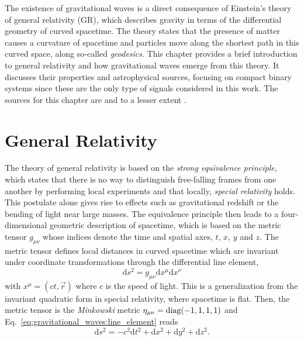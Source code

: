 The existence of gravitational waves is a direct consequence of Einstein's theory of general relativity (GR), which describes gravity in terms of the differential geometry of curved spacetime. The theory states that the presence of matter causes a curvature of spacetime and particles move along the shortest path in this curved space, along so-called \emph{geodesics}.
This chapter provides a brief introduction to general relativity and how gravitational waves emerge from this theory. It discusses their properties and astrophysical sources, focusing on compact binary systems since these are the only type of signals considered in this work. The sources for this chapter are \cite{10.1093/acprof:oso/9780198570745.001.0001} and to a lesser extent \cite{Carroll_2004}. 

\section{General Relativity}


The theory of general relativity is based on the \emph{strong equivalence principle}, which states that there is no way to distinguish free-falling frames from one another by performing local experiments and that locally, \emph{special relativity} holds. This postulate alone gives rise to effects such as gravitational redshift or the bending of light near large masses. The equivalence principle then leads to a four-dimensional geometric description of spacetime, which is based on the metric tensor $g_{\mu\nu}$ whose indices denote the time and spatial axes, $t$, $x$, $y$ and $z$.
The metric tensor defines local distances in curved spacetime which are invariant under coordinate transformations through the differential line element,
\begin{equation}
	\label{eq:gravitational_waves:line_element}
	\mathrm{d}s^2 = g_{\mu\nu}\mathrm{d}x^\mu\mathrm{d}x^\nu
\end{equation}
with $x^\mu = (ct, \vec{r})$ where $c$ is the speed of light.
This is a generalization from the invariant quadratic form in special relativity, where
spacetime is flat. Then, the metric tensor is the \emph{Minkowski} metric $\eta_{\mu\nu} = \operatorname*{diag}(-1, 1, 1, 1)$ and Eq.~\ref{eq:gravitational_waves:line_element} reads 
\begin{equation}
	\mathrm{d}s^2 = -c^2\mathrm{d}t^2 + \mathrm{d}x^2 + \mathrm{d}y^2 + \mathrm{d}z^2.
\end{equation}

